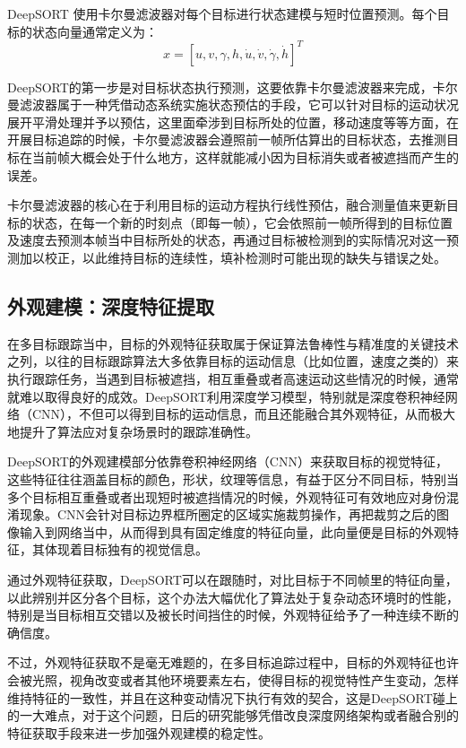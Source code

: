 DeepSORT 使用卡尔曼滤波器对每个目标进行状态建模与短时位置预测。每个目标的状态向量通常定义为：
\[x = [u, v, \gamma, h, \dot{u}, \dot{v}, \dot{\gamma}, \dot{h}]^{T}\]

DeepSORT的第一步是对目标状态执行预测，这要依靠卡尔曼滤波器来完成，卡尔曼滤波器属于一种凭借动态系统实施状态预估的手段，它可以针对目标的运动状况展开平滑处理并予以预估，这里面牵涉到目标所处的位置，移动速度等等方面，在开展目标追踪的时候，卡尔曼滤波器会遵照前一帧所估算出的目标状态，去推测目标在当前帧大概会处于什么地方，这样就能减小因为目标消失或者被遮挡而产生的误差。

卡尔曼滤波器的核心在于利用目标的运动方程执行线性预估，融合测量值来更新目标的状态，在每一个新的时刻点（即每一帧），它会依照前一帧所得到的目标位置及速度去预测本帧当中目标所处的状态，再通过目标被检测到的实际情况对这一预测加以校正，以此维持目标的连续性，填补检测时可能出现的缺失与错误之处。


\subsection{外观建模：深度特征提取}

在多目标跟踪当中，目标的外观特征获取属于保证算法鲁棒性与精准度的关键技术之列，以往的目标跟踪算法大多依靠目标的运动信息（比如位置，速度之类的）来执行跟踪任务，当遇到目标被遮挡，相互重叠或者高速运动这些情况的时候，通常就难以取得良好的成效。DeepSORT利用深度学习模型，特别就是深度卷积神经网络（CNN），不但可以得到目标的运动信息，而且还能融合其外观特征，从而极大地提升了算法应对复杂场景时的跟踪准确性。

DeepSORT的外观建模部分依靠卷积神经网络（CNN）来获取目标的视觉特征，这些特征往往涵盖目标的颜色，形状，纹理等信息，有益于区分不同目标，特别当多个目标相互重叠或者出现短时被遮挡情况的时候，外观特征可有效地应对身份混淆现象。CNN会针对目标边界框所圈定的区域实施裁剪操作，再把裁剪之后的图像输入到网络当中，从而得到具有固定维度的特征向量，此向量便是目标的外观特征，其体现着目标独有的视觉信息。

通过外观特征获取，DeepSORT可以在跟随时，对比目标于不同帧里的特征向量，以此辨别并区分各个目标，这个办法大幅优化了算法处于复杂动态环境时的性能，特别是当目标相互交错以及被长时间挡住的时候，外观特征给予了一种连续不断的确信度。

不过，外观特征获取不是毫无难题的，在多目标追踪过程中，目标的外观特征也许会被光照，视角改变或者其他环境要素左右，使得目标的视觉特性产生变动，怎样维持特征的一致性，并且在这种变动情况下执行有效的契合，这是DeepSORT碰上的一大难点，对于这个问题，日后的研究能够凭借改良深度网络架构或者融合别的特征获取手段来进一步加强外观建模的稳定性。

